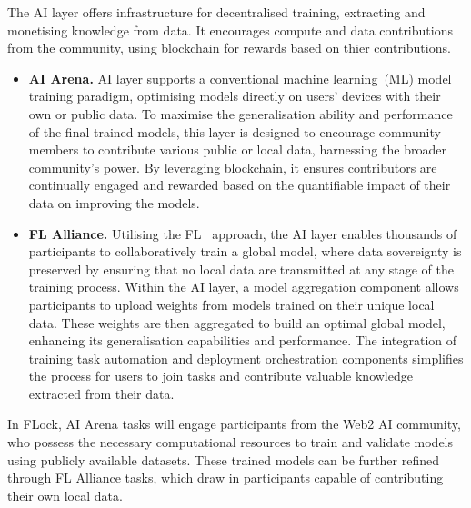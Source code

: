 \documentclass[conference]{IEEEtran}
\newcommand{\FL}{\ac{FL} Alliance\xspace}
\newcommand{\SNT}{{AI Arena}\xspace}
\begin{document}
The AI layer offers infrastructure for decentralised training, extracting and monetising knowledge from data. It encourages compute and data contributions from the community, using blockchain for rewards based on thier contributions.

\begin{itemize}
    \item {\textbf{\SNT.}} AI layer supports a conventional machine learning~(ML) model training paradigm, optimising models directly on users' devices with their own or public data. To maximise the generalisation ability and performance of the final trained models, this layer is designed to encourage community members to contribute various public or local data, harnessing the broader community's power. By leveraging blockchain, it ensures contributors are continually engaged and rewarded based on the quantifiable impact of their data on improving the models.

 \item  {\textbf{\FL.}} Utilising the FL~\cite{mcmahan2017communication} approach, the AI layer enables thousands of participants to collaboratively train a global model, where data sovereignty is preserved by ensuring that no local data are transmitted at any stage of the training process. Within the AI layer, a model aggregation component allows participants to upload weights from models trained on their unique local data. These weights are then aggregated to build an optimal global model, enhancing its generalisation capabilities and performance. The integration of training task automation and deployment orchestration components simplifies the process for users to join tasks and contribute valuable knowledge extracted from their data.



\end{itemize}

In FLock, \SNT tasks will engage participants from the Web2 AI community, who possess the necessary computational resources to train and validate models using publicly available datasets. These trained models can be further refined through \FL tasks, which draw in participants capable of contributing their own local data.


\end{document}
